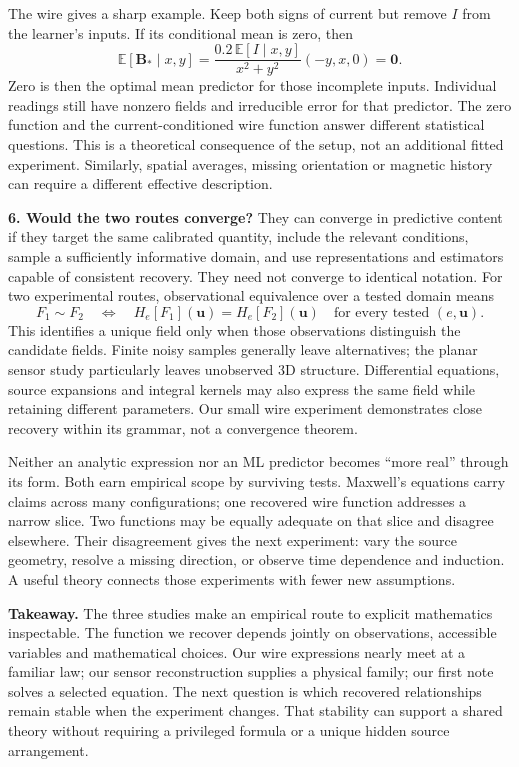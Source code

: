\documentclass[11pt,letterpaper]{article}
\begin{document}
The wire gives a sharp example. Keep both signs of current but remove $I$ from
the learner's inputs. If its conditional mean is zero, then
\begin{equation}
\mathbb E[\mathbf B_*\mid x,y]
=\frac{0.2\,\mathbb E[I\mid x,y]}{x^2+y^2}(-y,x,0)=\mathbf0.
\label{eq:missing}
\end{equation}
Zero is then the optimal mean predictor for those incomplete inputs. Individual
readings still have nonzero fields and irreducible error for that predictor.
The zero function and the current-conditioned wire function answer different
statistical questions. This is a theoretical consequence of the setup, not an
additional fitted experiment. Similarly, spatial averages, missing orientation
or magnetic history can require a different effective description.

\textbf{6. Would the two routes converge?}
They can converge in predictive content if they target the same calibrated
quantity, include the relevant conditions, sample a sufficiently informative
domain, and use representations and estimators capable of consistent recovery.
They need not converge to identical notation. For two experimental routes,
observational equivalence over a tested domain means
\begin{equation}
F_1\sim F_2\quad\Longleftrightarrow\quad
H_e[F_1](\mathbf u)=H_e[F_2](\mathbf u)
\quad\text{for every tested }(e,\mathbf u).
\label{eq:equivalence}
\end{equation}
This identifies a unique field only when those observations distinguish the
candidate fields. Finite noisy samples generally leave alternatives; the planar
sensor study particularly leaves unobserved 3D structure. Differential equations,
source expansions and integral kernels may also express the same field while
retaining different parameters. Our small wire experiment demonstrates close
recovery within its grammar, not a convergence theorem.

Neither an analytic expression nor an ML predictor becomes ``more real'' through
its form. Both earn empirical scope by surviving tests. Maxwell's equations carry
claims across many configurations; one recovered wire function addresses a narrow
slice. Two functions may be equally adequate on that slice and disagree elsewhere.
Their disagreement gives the next experiment: vary the source geometry, resolve
a missing direction, or observe time dependence and induction. A useful theory
connects those experiments with fewer new assumptions.

\textbf{Takeaway.}
The three studies make an empirical route to explicit mathematics inspectable.
The function we recover depends jointly on observations, accessible variables and
mathematical choices. Our wire expressions nearly meet at a familiar law; our
sensor reconstruction supplies a physical family; our first note solves a selected
equation. The next question is which recovered relationships remain stable when
the experiment changes. That stability can support a shared theory without
requiring a privileged formula or a unique hidden source arrangement.
\end{document}
